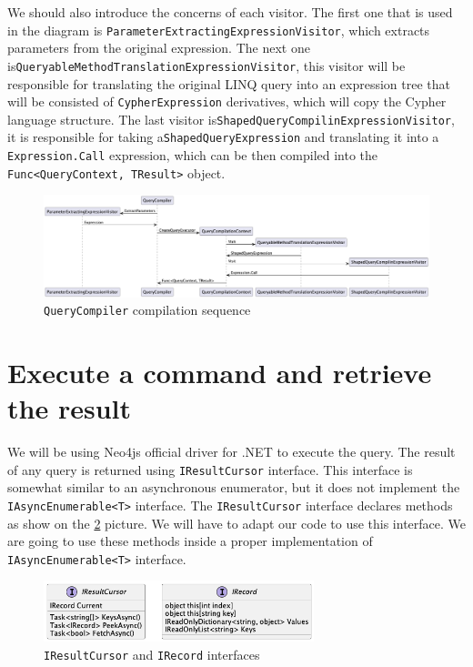 We should also introduce the concerns of each visitor. The first one that is used in the diagram is \texttt{ParameterExtractingExpressionVisitor},
which extracts parameters from the original expression. The next one is\linebreak\texttt{QueryableMethodTranslationExpressionVisitor}, this visitor will
be responsible for translating the original LINQ query into an expression tree that will be consisted of \texttt{CypherExpression} derivatives,
which will copy the Cypher language structure. The last visitor is\linebreak\texttt{ShapedQueryCompilinExpressionVisitor}, it is responsible
for taking a\linebreak\texttt{ShapedQueryExpression} and translating it into a \texttt{Expression.Call} expression, which can be then compiled into
the \texttt{Func<QueryContext, TResult>} object.

\begin{figure}[H]
    \centering
    \includegraphics[width=\textheight, angle=-90]{content/Translation Sequence.png}
    \caption{\texttt{QueryCompiler} compilation sequence}
    \label{fig:QueryCompilerSequence}
\end{figure}

\section{Execute a command and retrieve the result}

We will be using Neo4js official driver for .NET to execute the query. The result of any query
is returned using \texttt{IResultCursor} interface. This interface is somewhat similar to an asynchronous
enumerator, but it does not implement the \texttt{IAsyncEnumerable<T>} interface. The \texttt{IResultCursor} interface
declares methods as show on the \ref{fig:iresinterface} picture. We will have to adapt our code to use this interface.
We are going to use these methods inside a proper implementation of \texttt{IAsyncEnumerable<T>}
interface.

\begin{figure}[H]
    \centering
    \includegraphics[width=0.7\textwidth]{content/IResultCursor.png}
    \caption{\texttt{IResultCursor} and \texttt{IRecord} interfaces}
    \label{fig:iresinterface}
\end{figure}

